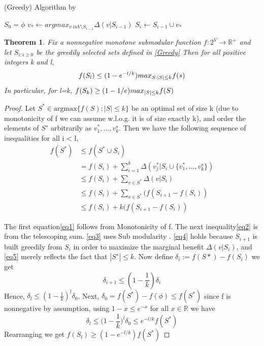 \documentclass[a4paper,twoside]{iiththesis}
\newtheorem{theorem}{Theorem}
\theoremstyle{definition}
\theoremstyle{definition}
\theoremstyle{remark}
\begin{document}
\begin{algorithm}
\caption{(Greedy) Algorithm by \cite{nemhauser}}
\label{Greedy}
\begin{algorithmic}[1]
\State $S_0= \phi$ 
\State $ v_{*} \leftarrow argmax_{v\ in V\setminus S_{i−1}} \Delta (v|S_{i-1})$
\State $S_i \leftarrow S_{i-1} \cup {v_*}$
\EndFor
\end{algorithmic}

\end{algorithm}
\theoremstyle{definition}
\begin{theorem}
 Fix a nonnegative monotone submodular function
$f : 2^V \rightarrow \mathbb{R}^+$ and let ${S_{i:i\geq0}}$
be the greedily selected sets defined in \ref{Greedy}
Then for all positive integers  k and l, 
\begin{equation}
f(S_l) \leq (1 - e^{-l/k})\space max_{S:|S|\leq k} f(s)
\end{equation}
In particular, for l=k, $f(S_k) \geq (1- 1/e) \space max_{|S|\leq k} f(S)$
\end{theorem}
\begin{proof}
 Let $S^* \in \text{argmax} \{f(S) : |S| \leq k\}$  be an optimal set of size k (due to monotonicity of f we can assume w.l.o.g. it is of size exactly k), and order the elements of $S^∗$ arbitrarily as ${v^{*}_{1}, . . . , v^{∗}_k}$. Then we have the following sequence of inequalities for all i < l,
 \begin{align}
 f(S^*) &\leq f(S^* \cup S_i) \label{eq1}\\
 		&= f(S_i) + \sum_{i=1}^k \Delta(v_j^* | S_i \cup \{{v^{*}_{1}, . . . , v^{∗}_k}\}) \label{eq2} \\
        &\leq f(S_i) + \sum_{v\in S^*} \Delta(v | S_i) \label{eq3}\\
        &\leq f(S_i) + \sum_{v\in S^*}  (f(S_{i+1} - f(S_i)) \label{eq4}\\
        &\leq f(S_i) + k(f(S_{i+1} - f(S_i)) \label{eq5}
 \end{align}


The first equation\ref{eq1} follows from Monotonicity of f. The next inequality\ref{eq2} is from the telescoping sum. \ref{eq3} uses Sub modularity . \ref{eq4}  holds because $S_{i+1}$ is built greedily from $S_i$ in order to maximize the marginal benefit $\Delta(v | S_i)$, and \ref{eq5} merely reflects the fact that $|S^∗| \leq k$. Now define $\delta_i := f(S*) - f(S_i)$ we get 
\begin{equation}
	\delta_{i+1} \leq (1 - \frac{1}{k}) \delta_i
\end{equation}
Hence, $\delta_l \leq (1 - \frac{1}{k}) ^ l \delta_0$. Next, $\delta_0 = f(S^*) - f(\phi) \leq f(S^*)$ since f is nonnegative by assumption, using $1-x \leq e^{-x}$  for all $x \in \mathbb{R}$ we have 
\begin{equation}
\delta_l \leq \Big(1 - \frac{1}{k}\Big)^l \delta_0 \leq e^{-l/k} f(S^*) 
\end{equation}
Rearranging we get $f(S_l) \geq (1 - e^{-l/k})f(S^*)$
\end{proof}
\end{document}
